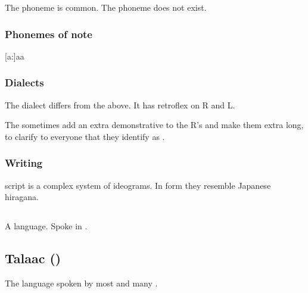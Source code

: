 The phoneme \txipa{[T]} is common. 
The phoneme \txipa{[p]} does not exist. 









\begin{pronunciationenvironment}{\subsubsection{Phonemes of note}}
  \pitem{\ahresphan}   {[a:]}{aa}
  \pitem{\aflatresphan}{[\ae]}{\aumlaut}
\end{pronunciationenvironment}





\subsubsection{Dialects}
The \Mystraacht{} dialect differs from the above. 
It has retroflex on R and L. 

The \CiriathSepher{} sometimes add an extra demonstrative  to the R's and make them extra long, to clarify to everyone that they identify as \CiriathSepher. 





\subsubsection{Writing}
\Resphan{} script is a complex system of ideograms. 
In form they resemble Japanese hiragana. 









\subsection{\Saphyr}
\index{\Saphyr}
A \caisith language. 
Spoke in . 









\subsection{Talaac (\Draconic)}
The language spoken by most \dragons and many \ophidians. 



